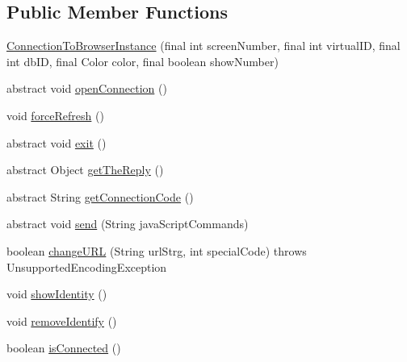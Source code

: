 \subsection*{Public Member Functions}
\begin{DoxyCompactItemize}
\item 
\hyperlink{classgov_1_1fnal_1_1ppd_1_1dd_1_1display_1_1client_1_1ConnectionToBrowserInstance_a5e820932a7dcbbed0c7415a58126344f}{Connection\-To\-Browser\-Instance} (final int screen\-Number, final int virtual\-I\-D, final int db\-I\-D, final Color color, final boolean show\-Number)
\item 
abstract void \hyperlink{classgov_1_1fnal_1_1ppd_1_1dd_1_1display_1_1client_1_1ConnectionToBrowserInstance_a6ea35c69c6beea9fc6432c7cdd969d63}{open\-Connection} ()
\item 
void \hyperlink{classgov_1_1fnal_1_1ppd_1_1dd_1_1display_1_1client_1_1ConnectionToBrowserInstance_abc6c5f397d2c3caa8120f0c5fc162eac}{force\-Refresh} ()
\item 
abstract void \hyperlink{classgov_1_1fnal_1_1ppd_1_1dd_1_1display_1_1client_1_1ConnectionToBrowserInstance_aa27f7bfb9140d6e4a7cd445cdade8460}{exit} ()
\item 
abstract Object \hyperlink{classgov_1_1fnal_1_1ppd_1_1dd_1_1display_1_1client_1_1ConnectionToBrowserInstance_a4450f02846a8a1329ca4a98afc2d1177}{get\-The\-Reply} ()
\item 
abstract String \hyperlink{classgov_1_1fnal_1_1ppd_1_1dd_1_1display_1_1client_1_1ConnectionToBrowserInstance_ada329c14279c5b9c099f7d9a3444f1e5}{get\-Connection\-Code} ()
\item 
abstract void \hyperlink{classgov_1_1fnal_1_1ppd_1_1dd_1_1display_1_1client_1_1ConnectionToBrowserInstance_ab58e70a2a6f47d1dc596f16fe33dedab}{send} (String java\-Script\-Commands)
\item 
boolean \hyperlink{classgov_1_1fnal_1_1ppd_1_1dd_1_1display_1_1client_1_1ConnectionToBrowserInstance_aa6927802e8cbd589721f2d44cf6fef5c}{change\-U\-R\-L} (String url\-Strg, int special\-Code)  throws Unsupported\-Encoding\-Exception 
\item 
void \hyperlink{classgov_1_1fnal_1_1ppd_1_1dd_1_1display_1_1client_1_1ConnectionToBrowserInstance_a667bbe4dea46410bf5b1c6ea4e7d6a33}{show\-Identity} ()
\item 
void \hyperlink{classgov_1_1fnal_1_1ppd_1_1dd_1_1display_1_1client_1_1ConnectionToBrowserInstance_a1d644697246321d2210bd5e82426e956}{remove\-Identify} ()
\item 
boolean \hyperlink{classgov_1_1fnal_1_1ppd_1_1dd_1_1display_1_1client_1_1ConnectionToBrowserInstance_ad564b4814a0652f8ae7a14f70147e493}{is\-Connected} ()

\end{DoxyCompactItemize}
